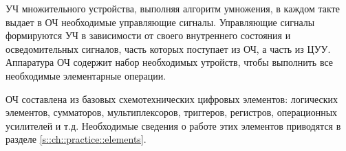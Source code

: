 УЧ множительного устройства, выполняя алгоритм умножения, в каждом такте выдает в ОЧ необходимые управляющие сигналы. Управляющие сигналы формируются УЧ в зависимости от своего внутреннего состояния и осведомительных сигналов, часть которых поступает из ОЧ, а часть из ЦУУ. Аппаратура ОЧ содержит набор необходимых утройств, чтобы выполнить все необходимые элементарные операции.

ОЧ составлена из базовых схемотехнических цифровых элементов: логических элементов, сумматоров, мультиплексоров, триггеров, регистров, операционных усилителей и т.д. Необходимые сведения о работе этих элементов приводятся в разделе \ref{s::ch::practice::elements}.





